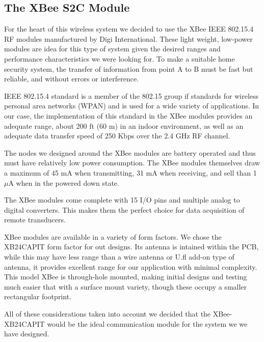 \documentclass[a4paper,11pt]{report}
\begin{document}
		\subsection{The XBee S2C Module}
		\par For the heart of this wireless system we decided to use the XBee IEEE 802.15.4 RF modules manufactured by Digi International. These light weight, low-power modules are idea for this type of system given the desired ranges and performance characteristics we were looking for. To make a suitable home security system, the transfer of information from point A to B must be fast but reliable, and without errors or interference. \par IEEE 802.15.4 standard is a member of the 802.15 group if standards for wireless personal area networks (WPAN) and is used for a wide variety of applications. In our case, the implementation of this standard in the XBee modules provides an adequate range, about 200 ft (60 m) in an indoor environment, as well as an adequate data transfer speed of 250 Kbps over the 2.4 GHz RF channel.     
		\par The nodes we designed around the XBee modules are battery operated and thus must have relatively low power consumption. The XBee modules themselves draw a maximum of 45 mA when transmitting, 31 mA when receiving, and sell than 1 $\mu$A when in the powered down state. 
		\par The XBee modules come complete with 15 I/O pins and multiple analog to digital converters. This makes them the perfect choice for data acquisition of remote transducers. 
		\par XBee modules are available in a variety of form factors. We chose the XB24CAPIT form factor for out designs. Its antenna is intained within the PCB, while this may have less range than a wire antenna or U.fl add-on type of antenna, it provides excellent range for our application with minimal complexity. This model XBee is through-hole mounted, making initial designs and testing much easier that with a surface mount variety, though these occupy a smaller rectangular footprint. 
		\par All of these considerations taken into account we decided that the XBee-XB24CAPIT would be the ideal communication module for the system we we have designed. \\
		
\end{document}
